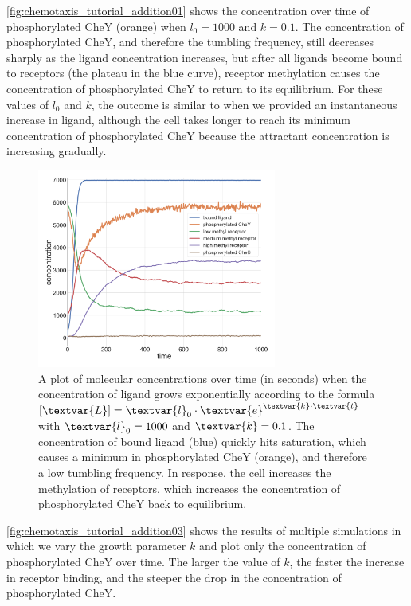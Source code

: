 \autoref{fig:chemotaxis_tutorial_addition01} shows the concentration over time of phosphorylated CheY (orange) when $l_0 = 1000$ and $k = 0.1$. The concentration of phosphorylated CheY, and therefore the tumbling frequency, still decreases sharply as the ligand concentration increases, but after all ligands become bound to receptors (the plateau in the blue curve), receptor methylation causes the concentration of phosphorylated CheY to return to its equilibrium. For these values of $l_0$ and $k$, the outcome is similar to when we provided an instantaneous increase in ligand, although the cell takes longer to reach its minimum concentration of phosphorylated CheY because the attractant concentration is increasing gradually.

\begin{figure}[h]
\centering
\mySfFamily
\includegraphics[width = 0.7\textwidth]{../images/chemotaxis_tutorial_addition01_vscode.png}
\caption{A plot of molecular concentrations over time (in seconds) when the concentration of ligand grows exponentially according to the formula  $[\textvar{L}] = \textvar{l}_\text{0} \cdot \textvar{e}^{\textvar{k} \cdot \textvar{t}}$ with $\textvar{l}_\text{0} = \text{1000}$ and $\textvar{k} = \text{0.1}$. The concentration of bound ligand (blue) quickly hits saturation, which causes a minimum in phosphorylated CheY (orange), and therefore a low tumbling frequency. In response, the cell increases the methylation of receptors, which increases the concentration of phosphorylated CheY back to equilibrium.}
\label{fig:chemotaxis_tutorial_addition01}
\end{figure}

\autoref{fig:chemotaxis_tutorial_addition03} shows the results of multiple simulations in which we vary the growth parameter $k$ and plot only the concentration of phosphorylated CheY over time. The larger the value of $k$, the faster the increase in receptor binding, and the steeper the drop in the concentration of phosphorylated CheY.

